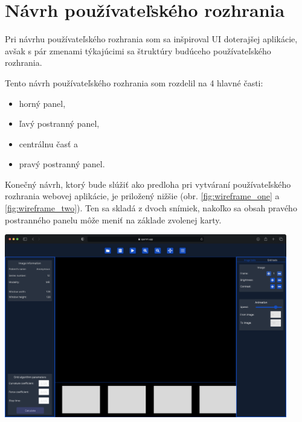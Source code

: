 \section {Návrh používateľského rozhrania}
Pri návrhu používateľského rozhrania som sa inšpiroval UI doterajšej aplikácie, avšak s pár zmenami týkajúcimi sa štruktúry budúceho používateľského rozhrania.

Tento návrh používateľského rozhrania som rozdelil na 4 hlavné časti:
\begin {itemize}
\item {horný panel,}
\item {ľavý postranný panel,}
\item {centrálnu časť a}
\item {pravý postranný panel.}
\end {itemize}

Konečný návrh, ktorý bude slúžiť ako predloha pri vytváraní používateľského rozhrania webovej aplikácie, je priložený nižšie (obr. \ref{fig:wireframe_one} a \ref{fig:wireframe_two}). Ten sa skladá z dvoch snímiek, nakoľko sa obsah pravého postranného panelu môže meniť na základe zvolenej karty.

\begin {center}
\centering
\includegraphics[height=8cm]{media/wireframes/1.png}
\captionsetup{justification=centering}
\label{fig:wireframe_one}
\end {center}

